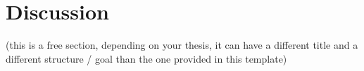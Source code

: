 \section{Discussion}
\label{sec::discussion}

(this is a free section, depending on your thesis, it can have a different title and a different structure / goal than the one provided in this template)